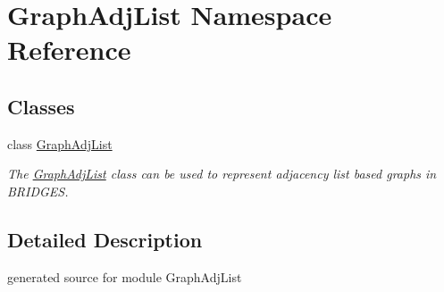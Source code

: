\hypertarget{namespace_graph_adj_list}{}\section{Graph\+Adj\+List Namespace Reference}
\label{namespace_graph_adj_list}
\subsection*{Classes}
\begin{DoxyCompactItemize}
\item 
class \hyperlink{class_graph_adj_list_1_1_graph_adj_list}{Graph\+Adj\+List}
\begin{DoxyCompactList}\small\item\em The \hyperlink{class_graph_adj_list_1_1_graph_adj_list}{Graph\+Adj\+List} class can be used to represent adjacency list based graphs in B\+R\+I\+D\+G\+ES. \end{DoxyCompactList}\end{DoxyCompactItemize}


\subsection{Detailed Description}
\begin{DoxyVerb}generated source for module GraphAdjList \end{DoxyVerb}
 